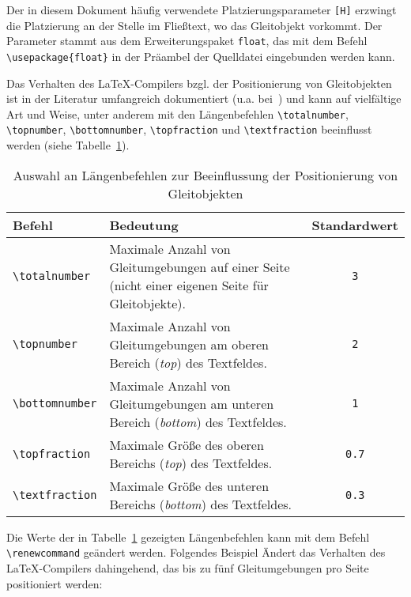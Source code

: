 Der in diesem Dokument häufig verwendete Platzierungsparameter \verb|[H]| erzwingt die Platzierung an der Stelle im Fließtext, wo das Gleitobjekt vorkommt. Der Parameter stammt aus dem Erweiterungspaket \verb|float|, das mit dem Befehl \verb|\usepackage{float}| in der Präambel der Quelldatei eingebunden werden kann.

Das Verhalten des \LaTeX-Compilers bzgl. der Positionierung von Gleitobjekten ist in der Literatur umfangreich dokumentiert (u.a. bei~\cite{Gleitobjekte_TeXwelt}) und kann auf vielfältige Art und Weise, unter anderem mit den Längenbefehlen 
\verb|\totalnumber|, 
\verb|\topnumber|, 
\verb|\bottomnumber|, 
\verb|\topfraction|
und \verb|\textfraction|
beeinflusst werden (siehe Tabelle~\ref{tab:LängenbefehleGleitumgebungen}). 


\begin{table}[h!tb]
	\centering
	\caption{Auswahl an Längenbefehlen zur Beeinflussung der Positionierung von Gleitobjekten}
	\label{tab:LängenbefehleGleitumgebungen}
    \begin{tabularx}{\textwidth}{lXc}
		\hline
		\textbf{Befehl} & \textbf{Bedeutung}  & \textbf{Standardwert} \\
		\hline
		\texttt{\textbackslash totalnumber}  & Maximale Anzahl von Gleitumgebungen auf einer Seite (nicht einer eigenen Seite für Gleitobjekte). & \texttt{3}    \\
		\texttt{\textbackslash topnumber}    & Maximale Anzahl von Gleitumgebungen am oberen Bereich (\textsl{top}) des Textfeldes. & \texttt{2}    \\ 
		\texttt{\textbackslash bottomnumber}  & Maximale Anzahl von Gleitumgebungen am unteren Bereich (\textsl{bottom}) des Textfeldes.  & \texttt{1}   \\
		\texttt{\textbackslash topfraction}   & Maximale Größe des oberen Bereichs (\textsl{top}) des Textfeldes. & \texttt{0.7} \\ 
		\texttt{\textbackslash textfraction}  & Maximale Größe des unteren Bereichs (\textsl{bottom}) des Textfeldes.  & \texttt{0.3}  \\ 
		\hline
	\end{tabularx}
\end{table}

Die Werte der in Tabelle~\ref{tab:LängenbefehleGleitumgebungen} gezeigten Längenbefehlen kann mit dem Befehl
\verb|\renewcommand| geändert werden. Folgendes Beispiel Ändert das Verhalten des \LaTeX-Compilers dahingehend, das bis zu fünf Gleitumgebungen pro Seite positioniert werden:

